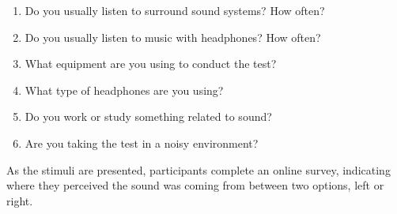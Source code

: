 \begin{enumerate}[label=\alph*)]
    \item Do you usually listen to surround sound systems? How often?
    \item Do you usually listen to music with headphones? How often?
    \item What equipment are you using to conduct the test?
    \item What type of headphones are you using?
    \item Do you work or study something related to sound?
    \item Are you taking the test in a noisy environment?
\end{enumerate}
As the stimuli are presented, participants complete an online survey, indicating where they perceived the sound was coming from between two options, left or right.
